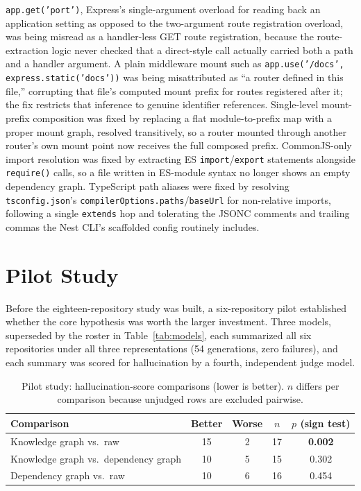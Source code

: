\documentclass[conference]{IEEEtran}
\begin{document}
\texttt{app.get('port')}, Express's single-argument overload for reading back an application
setting as opposed to the two-argument route registration overload, was being misread as a
handler-less GET route registration, because the route-extraction logic never checked that a
direct-style call actually carried both a path and a handler argument. A plain middleware mount
such as \texttt{app.use('/docs', express.static('docs'))} was being misattributed as ``a router
defined in this file,'' corrupting that file's computed mount prefix for routes registered after
it; the fix restricts that inference to genuine identifier references. Single-level mount-prefix
composition was fixed by replacing a flat module-to-prefix map with a proper mount graph,
resolved transitively, so a router mounted through another router's own mount point now receives
the full composed prefix. CommonJS-only import resolution was fixed by extracting ES
\texttt{import}/\texttt{export} statements alongside \texttt{require()} calls, so a file written
in ES-module syntax no longer shows an empty dependency graph. TypeScript path aliases were
fixed by resolving \texttt{tsconfig.json}'s \texttt{compilerOptions.paths}/\texttt{baseUrl} for
non-relative imports, following a single \texttt{extends} hop and tolerating the JSONC comments
and trailing commas the Nest CLI's scaffolded config routinely includes.

\section{Pilot Study}
\label{sec:pilot}

Before the eighteen-repository study was built, a six-repository pilot established whether the
core hypothesis was worth the larger investment. Three models, superseded by the roster in
Table~\ref{tab:models}, each summarized all six repositories under all three representations
(54 generations, zero failures), and each summary was scored for hallucination by a fourth,
independent judge model.

\begin{table}[htbp]
\caption{Pilot study: hallucination-score comparisons (lower is better). $n$ differs per
comparison because unjudged rows are excluded pairwise.}
\label{tab:pilot}
\centering
\begin{tabular}{@{}lcccc@{}}
\toprule
Comparison & Better & Worse & $n$ & $p$ (sign test) \\
\midrule
Knowledge graph vs.\ raw & 15 & 2 & 17 & \textbf{0.002} \\
Knowledge graph vs.\ dependency graph & 10 & 5 & 15 & 0.302 \\
Dependency graph vs.\ raw & 10 & 6 & 16 & 0.454 \\
\bottomrule
\end{tabular}
\end{table}
\end{document}
